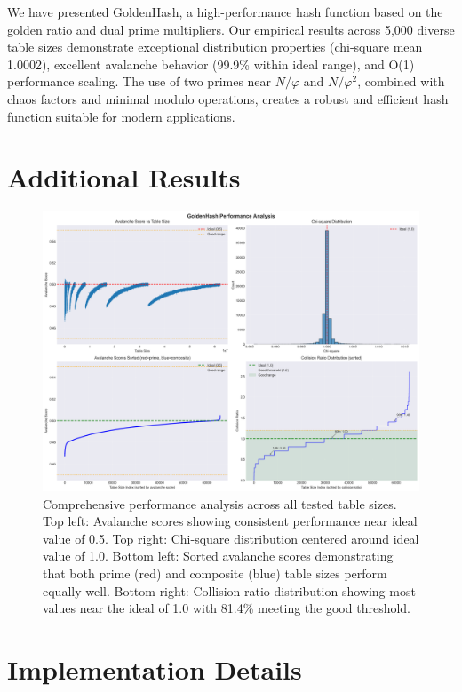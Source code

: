 \documentclass[11pt,a4paper]{article}
\theoremstyle{definition}
\begin{document}
We have presented GoldenHash, a high-performance hash function based on the golden ratio and dual prime multipliers. Our empirical results across 5,000 diverse table sizes demonstrate exceptional distribution properties (chi-square mean 1.0002), excellent avalanche behavior (99.9\% within ideal range), and O(1) performance scaling. The use of two primes near $N/\varphi$ and $N/\varphi^2$, combined with chaos factors and minimal modulo operations, creates a robust and efficient hash function suitable for modern applications.




\appendix

\section{Additional Results}

\begin{figure}[h]
\centering
\includegraphics[width=\textwidth]{goldenhash_analysis.png}
\caption{Comprehensive performance analysis across all tested table sizes. Top left: Avalanche scores showing consistent performance near ideal value of 0.5. Top right: Chi-square distribution centered around ideal value of 1.0. Bottom left: Sorted avalanche scores demonstrating that both prime (red) and composite (blue) table sizes perform equally well. Bottom right: Collision ratio distribution showing most values near the ideal of 1.0 with 81.4\% meeting the good threshold.}
\label{fig:analysis}
\end{figure}

\section{Implementation Details}
\end{document}
